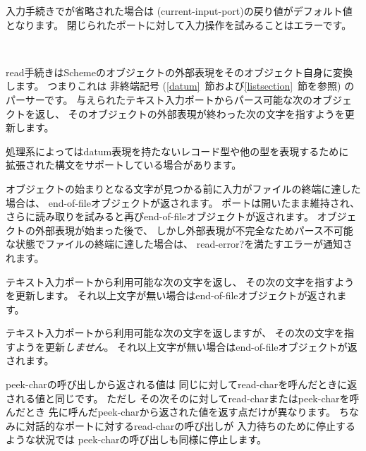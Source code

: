 入力手続きでが省略された場合は
{\cf (current-\+input-\+port)}の戻り値がデフォルト値となります。
閉じられたポートに対して入力操作を試みることはエラーです。

\noindent \hbox{ }  %
\vspace{-5ex}


\begin{entry}{%
}

{\cf read}手続きはSchemeのオブジェクトの外部表現をそのオブジェクト自身に変換します。
つまりこれは
非終端記号  (\ref{datum}~節および\ref{listsection}~節を参照)
のパーサーです。
与えられたテキスト入力ポートからパース可能な次のオブジェクトを返し、
そのオブジェクトの外部表現が終わった次の文字を指すようを更新します。

処理系によってはdatum表現を持たないレコード型や他の型を表現するために
拡張された構文をサポートしている場合があります。

\vest オブジェクトの始まりとなる文字が見つかる前に入力がファイルの終端に達した場合は、
end-of-fileオブジェクトが返されます。
ポートは開いたまま維持され、
さらに読み取りを試みると再びend-of-fileオブジェクトが返されます。
オブジェクトの外部表現が始まった後で、
しかし外部表現が不完全なためパース不可能な状態でファイルの終端に達した場合は、
{\cf read-error?}を満たすエラーが通知されます。

\end{entry}

\begin{entry}{%
}

テキスト入力ポートから利用可能な次の文字を返し、
その次の文字を指すようを更新します。
それ以上文字が無い場合はend-of-fileオブジェクトが返されます。

\end{entry}


\begin{entry}{%
}

テキスト入力ポートから利用可能な次の文字を返しますが、
その次の文字を指すようを更新{\em しません}。
それ以上文字が無い場合はend-of-fileオブジェクトが返されます。

\begin{note}
{\cf peek-char}の呼び出しから返される値は
同じに対して{\cf read-char}を呼んだときに返される値と同じです。
ただし
その次そのに対して{\cf read-char}または{\cf peek-char}を呼んだとき
先に呼んだ{\cf peek-char}から返された値を返す点だけが異なります。
ちなみに対話的なポートに対する{\cf read-char}の呼び出しが
入力待ちのために停止するような状況では
{\cf peek-char}の呼び出しも同様に停止します。
\end{note}

\end{entry}

